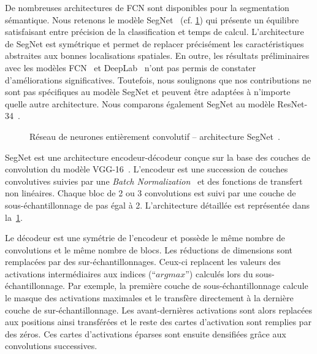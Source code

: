
De nombreuses architectures de \gls{FCN} sont disponibles pour la segmentation sémantique. Nous retenons le modèle SegNet~\cite{badrinarayanan_segnet_2017} (cf. \cref{fig:segnet}) qui présente un équilibre satisfaisant entre précision de la classification et temps de calcul. L'architecture de SegNet est symétrique et permet de replacer précisément les caractéristiques abstraites aux bonnes localisations spatiales. En outre, les résultats préliminaires avec les modèles \gls{FCN}~\cite{long_fully_2015} et DeepLab~\cite{l._c._chen_deeplab_2018} n'ont pas permis de constater d'améliorations significatives. Toutefois, nous soulignons que nos contributions ne sont pas spécifiques au modèle SegNet et peuvent être adaptées à n'importe quelle autre architecture. Nous comparons également SegNet au modèle ResNet-34~\cite{he_deep_2016}.

\begin{figure}
	\resizebox{\textwidth}{!}{%
	
	}
	\caption[Réseau de neurones entièrement convolutif -- architecture SegNet.]{Réseau de neurones entièrement convolutif -- architecture SegNet~\cite{badrinarayanan_segnet_2017}.}
	\label{fig:segnet}
\end{figure}

SegNet est une architecture encodeur-décodeur conçue sur la base des couches de convolution du modèle VGG-16~\cite{chatfield_return_2014,simonyan_very_2014}. L'encodeur est une succession de couches convolutives suivies par une \emph{Batch Normalization}~\cite{ioffe_batch_2015} et des fonctions de transfert non linéaires. Chaque bloc de 2 ou 3 convolutions est suivi par une couche de sous-échantillonnage de pas égal à 2. L'architecture détaillée est représentée dans la~\cref{fig:segnet}.

% 

Le décodeur est une symétrie de l'encodeur et possède le même nombre de convolutions et le même nombre de blocs. Les réductions de dimensions sont remplacées par des sur-échantillonnages. Ceux-ci replacent les valeurs des activations intermédiaires aux indices (``$argmax$'') calculés lors du sous-échantillonnage. Par exemple, la première couche de sous-échantillonnage calcule le masque des activations maximales et le transfère directement à la dernière couche de sur-échantillonnage. Les avant-dernières activations sont alors replacées aux positions ainsi transférées et le reste des cartes d'activation sont remplies par des zéros. Ces cartes d'activations éparses sont ensuite densifiées grâce aux convolutions successives.

